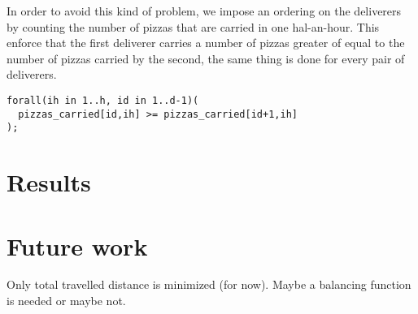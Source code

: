 \documentclass[10pt]{article}
\begin{document}
	In order to avoid this kind of problem, we impose an ordering on the deliverers by 
	counting the number of pizzas that are carried in one hal-an-hour. This enforce that 
	the first deliverer carries a number of pizzas greater of equal to the number of
	pizzas carried by the second, the same thing is done for every pair of deliverers.
\begin{verbatim}
forall(ih in 1..h, id in 1..d-1)(
  pizzas_carried[id,ih] >= pizzas_carried[id+1,ih]
);
\end{verbatim}

	\section{Results}
	\label{Results}



	\section{Future work}
	\label{Future work}
	Only total travelled distance is minimized (for now). Maybe a balancing 
	function is needed or maybe not.
\end{document}
